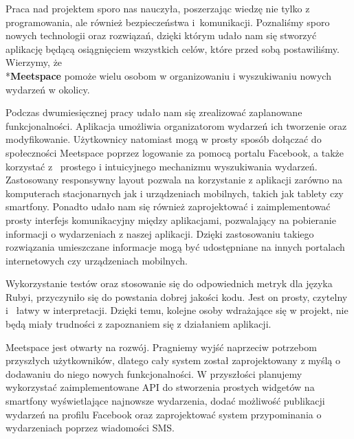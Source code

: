 Praca nad projektem sporo nas nauczyła, poszerzając wiedzę nie tylko z programowania, ale również bezpieczeństwa i~komunikacji.
Poznaliśmy sporo nowych technologii oraz rozwiązań, dzięki którym udało nam się stworzyć aplikację będącą osiągnięciem wszystkich celów, które przed sobą postawiliśmy.
Wierzymy, że \\*\textbf{Meetspace} pomoże wielu osobom w organizowaniu i wyszukiwaniu nowych wydarzeń w okolicy.

Podczas dwumiesięcznej pracy udało nam się zrealizować zaplanowane funkcjonalności.
Aplikacja umożliwia organizatorom wydarzeń ich tworzenie oraz modyfikowanie.
Użytkownicy natomiast mogą w prosty sposób dołączać do społeczności Meetspace poprzez logowanie za pomocą portalu Facebook, a także korzystać z~ prostego i intuicyjnego mechanizmu wyszukiwania wydarzeń.
Zastosowany responsywny layout pozwala na korzystanie z aplikacji zarówno na komputerach stacjonarnych jak i urządzeniach mobilnych, takich jak tablety czy smartfony.
Ponadto udało nam się również zaprojektować i zaimplementować prosty interfejs komunikacyjny między aplikacjami, pozwalający na pobieranie informacji o wydarzeniach z naszej aplikacji.
Dzięki zastosowaniu takiego rozwiązania umieszczane informacje mogą być udostępniane na innych portalach internetowych czy urządzeniach mobilnych.

Wykorzystanie testów oraz stosowanie się do odpowiednich metryk dla języka Rubyi, przyczyniło się do powstania dobrej jakości kodu. Jest on prosty, czytelny i~ łatwy w interpretacji. Dzięki temu, kolejne osoby wdrażające się w projekt, nie będą miały trudności z zapoznaniem się z działaniem aplikacji.

Meetspace jest otwarty na rozwój. Pragniemy wyjść naprzeciw potrzebom przyszłych użytkowników, dlatego cały system został zaprojektowany z myślą o dodawaniu do niego nowych funkcjonalności.
W przyszłości planujemy wykorzystać zaimplementowane API do stworzenia prostych widgetów na smartfony wyświetlające najnowsze wydarzenia,
dodać możliwość publikacji wydarzeń na profilu Facebook oraz zaprojektować system przypominania o wydarzeniach poprzez wiadomości SMS.
